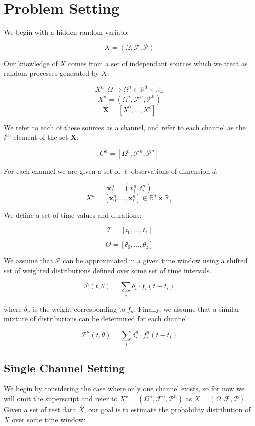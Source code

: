 \documentclass[10pt]{article}
\begin{document}
\section{Problem Setting}
We begin with a hidden random variable 

\[ X = (\Omega,\mathcal{F},\mathcal{P}) \]

Our knowledge of \( X \) comes from a set of independant sources which we treat as random processes generated by \( X \):

\[ X^n : \Omega \mapsto \Omega^n \in \mathbb{R}^d \times \mathbb{R}_+  \]
\[ X^n = (\Omega^n,\mathcal{F}^n,\mathcal{P}^n) \]
\[ \mathbf{X} = [X^0,...,X^c]   \]

We refer to each of these sources as a channel, and refer to each channel as the \( i^\text{th} \) element of the set \( \mathbf{X} \):

\[ C^n = [\Omega^n,\mathcal{F}^n,\mathcal{P}^n] \]

For each channel we are given a set of \( \ell \) observations of dimension \( d \):

\[ \mathbf{x}_i^n = (x_i^n, t_i^n ) \]
\[ X^n = \left[ \mathbf{x}_0^n,\hdots,\mathbf{x}_\ell^n \right] \in \mathbb{R}^d \times \mathbb{R}_+ \]

We define a set of time values and durations:

\[  \mathcal{T} = [ t_0,\hdots,t_\ell ] \]

\[ \Theta = [ \theta_0,\hdots,\theta_z ] \]

We assume that \( \mathcal{P} \) can be approximated in a given time window using a shifted set of weighted distributions defined over some set of time intervals.

\begin{equation} \mathcal{P}(t,\theta) = \sum_i \delta_i \cdot f_i(t - t_i) \end{equation}

where \( \delta_n \) is the weight corresponding to \( f_n \).  Finally, we assume that a similar mixture of distributions can be determined for each channel:

\begin{equation} \mathcal{P}^n(t,\theta) = \sum_i \delta_i^n \cdot f_i^n(t - t_i) \end{equation}

\subsection{Single Channel Setting}
We begin by considering the case where only one channel exists, so for now we will omit the superscript and refer to \(X^n = (\Omega^n,\mathcal{F}^n,\mathcal{P}^n) \) as \(X = (\Omega, \mathcal{F},\mathcal{P}) \).  Given a set of test data \( \hat{X} \), our goal is to estimate the probability distribution of \( X \) over some time window:
\end{document}
